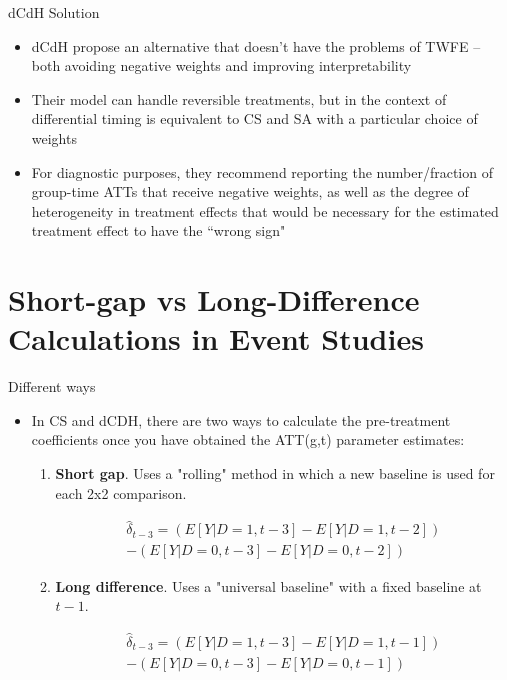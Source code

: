 \documentclass{beamer}
\begin{document}
\begin{frame}{dCdH Solution}

\begin{itemize}
\item dCdH propose an alternative that doesn't have the problems of TWFE -- both avoiding negative weights and improving interpretability
\item Their model can handle reversible treatments, but in the context of differential timing is equivalent to CS and SA with a particular choice of weights
\item For diagnostic purposes, they recommend reporting the number/fraction of group-time ATTs that receive negative weights, as well as the degree of heterogeneity in treatment eﬀects that would be necessary for the estimated treatment eﬀect to have the “wrong sign"

\end{itemize}

\end{frame}



\section{Short-gap vs Long-Difference Calculations in Event Studies}



\begin{frame}{Different ways}

\begin{itemize}

\item In CS and dCDH, there are two ways to calculate the pre-treatment coefficients once you have obtained the ATT(g,t) parameter estimates:
	\begin{enumerate}
	\item \textbf{Short gap}. Uses a "rolling" method in which a new baseline is used for each 2x2 comparison.
	
	\begin{eqnarray*}
	 \widehat{\delta}_{t-3} = \left( E[Y|D=1, t-3] - E[Y|D=1, t-2] \right) \\
	 - \left( E[Y|D=0, t-3] - E[Y|D=0, t-2] \right)
	 \end{eqnarray*}
	 
	\item \textbf{Long difference}. Uses a "universal baseline" with a fixed baseline at \( t-1 \).
	
	\begin{eqnarray*}
	 \widehat{\delta}_{t-3} = \left( E[Y|D=1, t-3] - E[Y|D=1, t-1] \right) \\
	 - \left( E[Y|D=0, t-3] - E[Y|D=0, t-1] \right)
	 \end{eqnarray*}

	\end{enumerate}
\end{itemize}

\end{frame}
\end{document}
